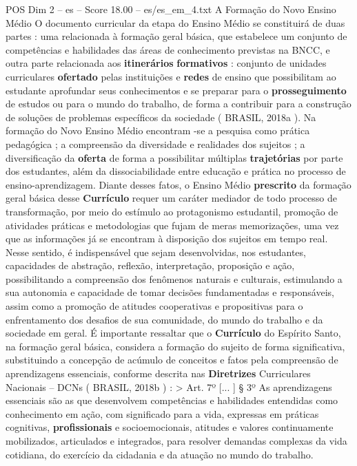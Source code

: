 \begin{textsample}{POS Dim 2 – es – Score 18.00 – es/es\_em\_4.txt}  \label{ex:f2_pos_218}
A Formação do Novo Ensino Médio O documento curricular da etapa do Ensino Médio se constituirá de duas partes : uma relacionada à formação geral básica, que estabelece um conjunto de competências e habilidades das áreas de conhecimento previstas na BNCC, e outra parte relacionada aos \textbf{itinerários} \textbf{formativos} : conjunto de unidades curriculares \textbf{ofertado} pelas instituições e \textbf{redes} de ensino que possibilitam ao estudante aprofundar seus conhecimentos e se preparar para o \textbf{prosseguimento} de estudos ou para o mundo do trabalho, de forma a contribuir para a construção de soluções de problemas específicos da sociedade ( BRASIL, 2018a ).
Na formação do Novo Ensino Médio encontram -se a pesquisa como prática pedagógica ; a compreensão da diversidade e realidades dos sujeitos ; a diversificação da \textbf{oferta} de forma a possibilitar múltiplas \textbf{trajetórias} por parte dos estudantes, além da dissociabilidade entre educação e prática no processo de ensino-aprendizagem.
Diante desses fatos, o Ensino Médio \textbf{prescrito} da formação geral básica desse \textbf{Currículo} requer um caráter mediador de todo processo de transformação, por meio do estímulo ao protagonismo estudantil, promoção de atividades práticas e metodologias que fujam de meras memorizações, uma vez que as informações já se encontram à disposição dos sujeitos em tempo real.
Nesse sentido, é indispensável que sejam desenvolvidas, nos estudantes, capacidades de abstração, reflexão, interpretação, proposição e ação, possibilitando a compreensão dos fenômenos naturais e culturais, estimulando a sua autonomia e capacidade de tomar decisões fundamentadas e responsáveis, assim como a promoção de atitudes cooperativas e propositivas para o enfrentamento dos desafios de sua comunidade, do mundo do trabalho e da sociedade em geral.
É importante ressaltar que o \textbf{Currículo} do Espírito Santo, na formação geral básica, considera a formação do sujeito de forma significativa, substituindo a concepção de acúmulo de conceitos e fatos pela compreensão de aprendizagens essenciais, conforme descrita nas \textbf{Diretrizes} Curriculares Nacionais – DCNs ( BRASIL, 2018b ) : > Art. 7º [... ] § 3º As aprendizagens essenciais são as que desenvolvem competências e habilidades entendidas como conhecimento em ação, com significado para a vida, expressas em práticas cognitivas, \textbf{profissionais} e socioemocionais, atitudes e valores continuamente mobilizados, articulados e integrados, para resolver demandas complexas da vida cotidiana, do exercício da cidadania e da atuação no mundo do trabalho.

\end{textsample}
